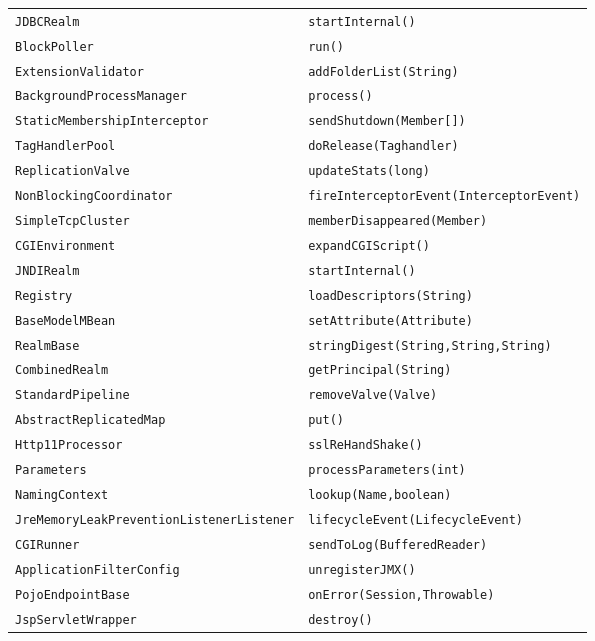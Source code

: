 \begin{center}
\begin{longtable}{ll}
\lstinline/JDBCRealm/&{\lstinline/startInternal()/}\\
\lstinline/BlockPoller/&{\lstinline/run()/}\\
\lstinline/ExtensionValidator/&{\lstinline/addFolderList(String)/}\\
\lstinline/BackgroundProcessManager/&{\lstinline/process()/}\\
\lstinline/StaticMembershipInterceptor/&{\lstinline/sendShutdown(Member[])/}\\
\lstinline/TagHandlerPool/&{\lstinline/doRelease(Taghandler)/}\\
\lstinline/ReplicationValve/&{\lstinline/updateStats(long)/}\\
\lstinline/NonBlockingCoordinator/&{\lstinline/fireInterceptorEvent(InterceptorEvent)/}\\
\lstinline/SimpleTcpCluster/&{\lstinline/memberDisappeared(Member)/}\\
\lstinline/CGIEnvironment/&{\lstinline/expandCGIScript()/}\\
\lstinline/JNDIRealm/&{\lstinline/startInternal()/}\\
\lstinline/Registry/&{\lstinline/loadDescriptors(String)/}\\
\lstinline/BaseModelMBean/&{\lstinline/setAttribute(Attribute)/}\\
\lstinline/RealmBase/&{\lstinline/stringDigest(String,String,String)/}\\
\lstinline/CombinedRealm/&{\lstinline/getPrincipal(String)/}\\
\lstinline/StandardPipeline/&{\lstinline/removeValve(Valve)/}\\
\lstinline/AbstractReplicatedMap/&{\lstinline/put()/}\\
\lstinline/Http11Processor/&{\lstinline/sslReHandShake()/}\\
\lstinline/Parameters/&{\lstinline/processParameters(int)/}\\
\lstinline/NamingContext/&{\lstinline/lookup(Name,boolean)/}\\
\lstinline/JreMemoryLeakPreventionListenerListener/&{\lstinline/lifecycleEvent(LifecycleEvent)/}\\
\lstinline/CGIRunner/&{\lstinline/sendToLog(BufferedReader)/}\\
\lstinline/ApplicationFilterConfig/&{\lstinline/unregisterJMX()/}\\
\lstinline/PojoEndpointBase/&{\lstinline/onError(Session,Throwable)/}\\
\lstinline/JspServletWrapper/&{\lstinline/destroy()/}\\

\end{longtable}
\end{center}
